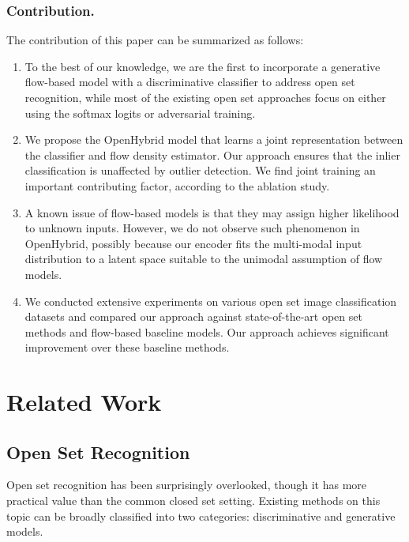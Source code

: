 \documentclass[runningheads]{llncs}
\begin{document}
\subsubsection{Contribution.} The contribution of this paper can be summarized as follows:
\begin{enumerate}
\item To the best of our knowledge, we are the first to incorporate a generative flow-based model with a discriminative classifier to address open set recognition, while most of the existing open set approaches focus on either using the softmax logits or adversarial training.
\item We propose the OpenHybrid model that learns a joint representation between the classifier and flow density estimator. Our approach ensures that the inlier classification is unaffected by outlier detection. We find joint training an important contributing factor, according to the ablation study.
\item A known issue of flow-based models is that they may assign higher likelihood to unknown inputs. However, we do not observe such phenomenon in OpenHybrid, possibly because our encoder fits the multi-modal input distribution to a latent space suitable to the unimodal assumption of flow models.
\item We conducted extensive experiments on various open set image classification datasets and compared our approach against  state-of-the-art open set methods and flow-based baseline models. Our approach achieves significant improvement over these baseline methods.
\end{enumerate}


\section{Related Work}

\subsection{Open Set Recognition}
Open set recognition has been surprisingly overlooked, though it has more practical value than the common closed set setting. Existing methods on this topic can be broadly classified into two categories: discriminative and generative models. 
\end{document}
